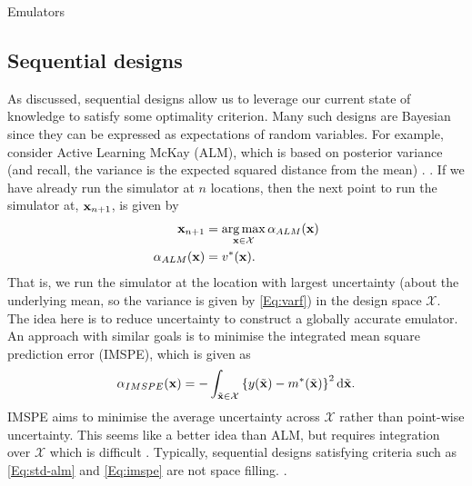 \begin{chapter}{Emulators \label{Ch:Emulators}}
\subsection{Sequential designs}
As discussed, sequential designs allow us to leverage our current state of knowledge to satisfy some optimality criterion. Many such designs are Bayesian since they can be expressed as expectations of random variables. For example, consider Active Learning McKay (ALM), which is based on posterior variance (and recall, the variance is the expected squared distance from the mean) \citep{Seo2000}. . If we have already run the simulator at $n$ locations, then the next point to run the simulator at, $\mathbf{x}_{n+1}$, is given by
\begin{align}
  \mathbf{x}_{n+1} &= \operatorname*{arg\,max}_{\mathbf{x} \in \mathcal{X}} \alpha_{ALM}(\mathbf{x})\\
    \alpha_{ALM}(\mathbf{x}) &= v^{*}(\mathbf{x}). \label{Eq:std-alm}
\end{align}
That is, we run the simulator at the location with largest uncertainty (about the underlying mean, so the variance is given by \cref{Eq:varf}) in the design space $\mathcal{X}$. The idea here is to reduce uncertainty to construct a globally accurate emulator. An approach with similar goals is to minimise the integrated mean square prediction error (IMSPE), which is given as
\begin{equation}
  \alpha_{IMSPE}(\mathbf{x}) =  -  \int_{\tilde{\mathbf{x}} \in \mathcal{X}} \left\{ y(\tilde{\mathbf{x}}) - m^* (\tilde{\mathbf{x}}) \right\} ^2 \text{d} \tilde{\mathbf{x}}. \label{Eq:imspe}
\end{equation}
IMSPE aims to minimise the average uncertainty across $\mathcal{X}$ rather than point-wise uncertainty. This seems like a better idea than ALM, but requires integration over $\mathcal{X}$ which is difficult \citep{Gramacy2020surrogates}.  Typically, sequential designs satisfying criteria such as \cref{Eq:std-alm} and \cref{Eq:imspe} are not space filling. .

\end{chapter}
